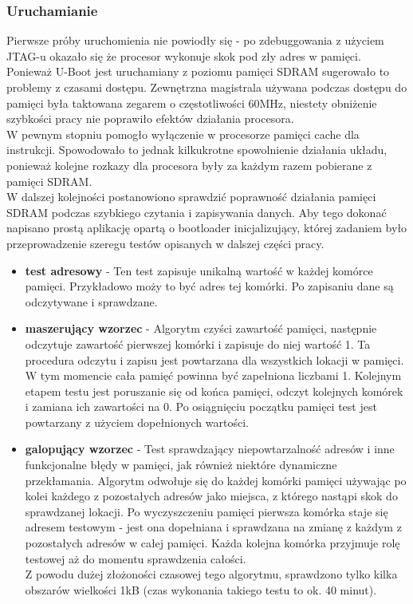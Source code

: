 \documentclass[a4paper,12pt]{book}
\begin{document}
				\subsubsection{Uruchamianie}
				Pierwsze próby uruchomienia nie powiodły się - po zdebuggowania z użyciem JTAG-u okazało się że procesor wykonuje skok pod zły adres w pamięci. Ponieważ U-Boot jest uruchamiany z poziomu pamięci SDRAM sugerowało to problemy z czasami dostępu. Zewnętrzna magistrala używana podczas dostępu do pamięci była taktowana zegarem o częstotliwości 60MHz, niestety obniżenie szybkości pracy nie poprawiło efektów działania procesora.\\
				W pewnym stopniu pomogło wyłączenie w procesorze pamięci cache dla instrukcji. Spowodowało to jednak kilkukrotne spowolnienie działania układu, ponieważ kolejne rozkazy dla procesora były za każdym razem pobierane z pamięci SDRAM.\\
				W dalszej kolejności postanowiono sprawdzić poprawność działania pamięci SDRAM podczas szybkiego czytania i zapisywania danych. Aby tego dokonać napisano prostą aplikację opartą o bootloader inicjalizujący, której zadaniem było przeprowadzenie szeregu testów opisanych w dalszej części pracy.
				\begin{itemize}
 					\item \textbf{test adresowy} - Ten test zapisuje unikalną wartość w każdej komórce pamięci. Przykładowo moży to być adres tej komórki. Po zapisaniu dane są odczytywane i sprawdzane. 
					\item \textbf{maszerujący wzorzec} - Algorytm czyści zawartość pamięci, następnie odczytuje zawartość pierwszej komórki i zapisuje do niej wartość 1. Ta procedura odczytu i zapisu jest powtarzana dla wszystkich lokacji w pamięci. W tym momencie cała pamięć powinna być zapełniona liczbami 1. Kolejnym etapem testu jest poruszanie się od końca pamięci, odczyt kolejnych komórek i zamiana ich zawartości na 0. Po osiągnięciu początku pamięci test jest powtarzany z użyciem dopełnionych wartości.
					\item \textbf{galopujący wzorzec} - Test sprawdzający niepowtarzalność adresów i inne funkcjonalne błędy w pamięci, jak również niektóre dynamiczne przekłamania. Algorytm odwołuje się do każdej komórki pamięci używając po kolei każdego z pozostałych adresów jako miejsca, z którego nastąpi skok do sprawdzanej lokacji. Po wyczyszczeniu pamięci pierwsza komórka staje się adresem testowym - jest ona dopełniana i sprawdzana na zmianę z każdym z pozostałych adresów w całej pamięci. Każda kolejna komórka przyjmuje rolę testowej aż do momentu sprawdzenia całości.\\
					Z powodu dużej złożoności czasowej tego algorytmu, sprawdzono tylko kilka obszarów wielkości 1kB (czas wykonania takiego testu to ok. 40 minut).
				\end{itemize}
\end{document}
